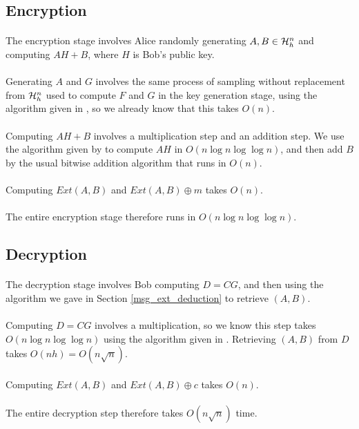 \subsection{Encryption}
\paragraph{}
The encryption stage involves Alice randomly generating $A, B \in \mathcal{H}_h^n$ and computing $AH + B$, where $H$ is Bob's public key.

\paragraph{}
Generating $A$ and $G$ involves the same process of sampling without replacement from $\mathcal{H}_h^n$ used to compute $F$ and $G$ in the key generation stage, using the algorithm given in \cite{10.1007/3-540-13883-8_89}, so we already know that this takes $O(n)$.

\paragraph{}
Computing $AH + B$ involves a multiplication step and an addition step. We use the algorithm given by \cite{schonhage1971schnelle} to compute $AH$ in $O(n \log{n} \log{\log{n}})$, and then add $B$ by the usual bitwise addition algorithm that runs in $O(n)$.

\paragraph{}
Computing $Ext(A, B)$ and $Ext(A, B) \oplus m$ takes $O(n)$.

\paragraph{}
The entire encryption stage therefore runs in $O(n \log{n} \log{\log{n}})$.

\subsection{Decryption}
\paragraph{}
The decryption stage involves Bob computing $D = CG$, and then using the algorithm we gave in Section \ref{msg_ext_deduction} to retrieve $(A, B)$.

\paragraph{}
Computing $D = CG$ involves a multiplication, so we know this step takes $O(n \log{n} \log{\log{n}})$ using the algorithm given in \cite{schonhage1971schnelle}. Retrieving $(A, B)$ from $D$ takes $O(nh) = O(n \sqrt{n})$.

\paragraph{}
Computing $Ext(A, B)$ and $Ext(A, B) \oplus c$ takes $O(n)$.

\paragraph{}
The entire decryption step therefore takes $O(n \sqrt{n})$ time.